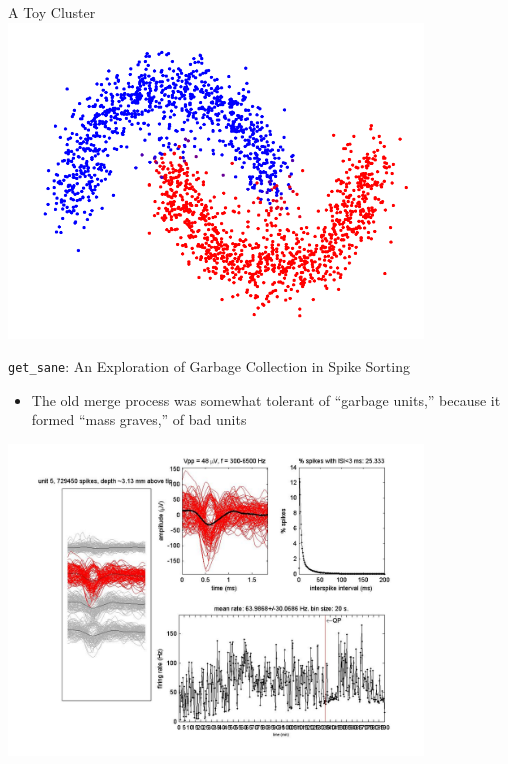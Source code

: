 \documentclass[11pt,handout]{beamer}
\begin{document}
    \begin{frame}{A Toy Cluster}
        \pause
        \includegraphics[width=110mm]{images/cluster.png}
    \end{frame}

    \begin{frame}{\texttt{get\_sane}: An Exploration of Garbage Collection in
Spike Sorting}
        \begin{itemize}
            \pause
            \item The old merge process was somewhat tolerant of ``garbage
units,'' because it formed ``mass graves,'' of bad units
            \pause
        \end{itemize}
        \includegraphics[width=110mm]{images/unit5.jpg}
    \end{frame}
\end{document}
